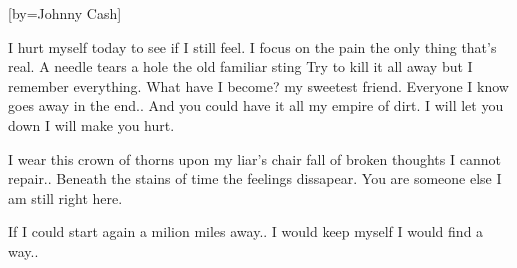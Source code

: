 [by={Johnny Cash}]

\beginverse
I hurt myself today
to see if I still feel.
I focus on the pain
the only thing that's real.
A needle tears a hole
the old familiar sting
Try to kill it all away
but I remember everything.
\endverse
\beginchorus
What have I become?
my sweetest friend.
Everyone I know
goes away in the end..
And you could have it all
my empire of dirt.
I will let you down
I will make you hurt.
\endchorus
\beginverse

I wear this crown of thorns
upon my liar's chair
fall of broken thoughts
I cannot repair..
Beneath the stains of time
the feelings dissapear.
You are someone else
I am still right here.
\endverse
\beginchorus

If I could start again
a milion miles away..
I would keep myself
I would find a way..
\endchorus
\endsong
